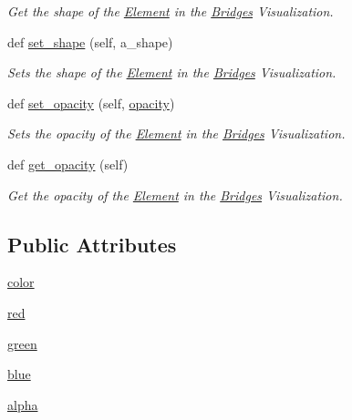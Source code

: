 \begin{DoxyCompactItemize}
\begin{DoxyCompactList}\small\item\em Get the shape of the \hyperlink{namespace_element}{Element} in the \hyperlink{namespace_bridges}{Bridges} Visualization. \end{DoxyCompactList}\item 
def \hyperlink{class_element_visualizer_1_1_element_visualizer_a6298b9b9e83e727d0e62b3f0e56ed400}{set\+\_\+shape} (self, a\+\_\+shape)
\begin{DoxyCompactList}\small\item\em Sets the shape of the \hyperlink{namespace_element}{Element} in the \hyperlink{namespace_bridges}{Bridges} Visualization. \end{DoxyCompactList}\item 
def \hyperlink{class_element_visualizer_1_1_element_visualizer_aa2a6d1de5ed27927ea4137aade739d85}{set\+\_\+opacity} (self, \hyperlink{class_element_visualizer_1_1_element_visualizer_a5350d49c7b8cdf5d93f5012db7229268}{opacity})
\begin{DoxyCompactList}\small\item\em Sets the opacity of the \hyperlink{namespace_element}{Element} in the \hyperlink{namespace_bridges}{Bridges} Visualization. \end{DoxyCompactList}\item 
def \hyperlink{class_element_visualizer_1_1_element_visualizer_aed71088aadfd53ec027241028570485d}{get\+\_\+opacity} (self)
\begin{DoxyCompactList}\small\item\em Get the opacity of the \hyperlink{namespace_element}{Element} in the \hyperlink{namespace_bridges}{Bridges} Visualization. \end{DoxyCompactList}\end{DoxyCompactItemize}
\subsection*{Public Attributes}
\begin{DoxyCompactItemize}
\item 
\hyperlink{class_element_visualizer_1_1_element_visualizer_a5431b724cdf714e3820020fea31eddcd}{color}
\item 
\hyperlink{class_element_visualizer_1_1_element_visualizer_a06e5ddbc77f8d3b1b36d1cd21dd7e970}{red}
\item 
\hyperlink{class_element_visualizer_1_1_element_visualizer_af03824fe3e19d46a68b62113b05adaaf}{green}
\item 
\hyperlink{class_element_visualizer_1_1_element_visualizer_a01f0083ffcc20a2a2831f62c130191d1}{blue}
\item 
\hyperlink{class_element_visualizer_1_1_element_visualizer_af785eabe744cce3b2c0a4ca148eb6111}{alpha}
\end{DoxyCompactItemize}
